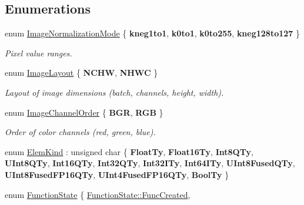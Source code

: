 \subsection*{Enumerations}
\begin{DoxyCompactItemize}
\item 
\mbox{\label{namespaceglow_af836699afb1d36a88df0d50d74fde931}} 
enum \hyperlink{namespaceglow_af836699afb1d36a88df0d50d74fde931}{Image\+Normalization\+Mode} \{ {\bfseries kneg1to1}, 
{\bfseries k0to1}, 
{\bfseries k0to255}, 
{\bfseries kneg128to127}
 \}\begin{DoxyCompactList}\small\item\em Pixel value ranges. \end{DoxyCompactList}
\item 
\mbox{\label{namespaceglow_a06c384b9844d09e4dd277eb509728dce}} 
enum \hyperlink{namespaceglow_a06c384b9844d09e4dd277eb509728dce}{Image\+Layout} \{ {\bfseries N\+C\+HW}, 
{\bfseries N\+H\+WC}
 \}\begin{DoxyCompactList}\small\item\em Layout of image dimensions (batch, channels, height, width). \end{DoxyCompactList}
\item 
\mbox{\label{namespaceglow_a2747942676633510584a944637b8eb59}} 
enum \hyperlink{namespaceglow_a2747942676633510584a944637b8eb59}{Image\+Channel\+Order} \{ {\bfseries B\+GR}, 
{\bfseries R\+GB}
 \}\begin{DoxyCompactList}\small\item\em Order of color channels (red, green, blue). \end{DoxyCompactList}
\item 
enum \hyperlink{namespaceglow_ab92e14a94329daf4083db670e95fbcdf}{Elem\+Kind} \+: unsigned char \{ \newline
{\bfseries Float\+Ty}, 
{\bfseries Float16\+Ty}, 
{\bfseries Int8\+Q\+Ty}, 
{\bfseries U\+Int8\+Q\+Ty}, 
\newline
{\bfseries Int16\+Q\+Ty}, 
{\bfseries Int32\+Q\+Ty}, 
{\bfseries Int32\+I\+Ty}, 
{\bfseries Int64\+I\+Ty}, 
\newline
{\bfseries U\+Int8\+Fused\+Q\+Ty}, 
{\bfseries U\+Int8\+Fused\+F\+P16\+Q\+Ty}, 
{\bfseries U\+Int4\+Fused\+F\+P16\+Q\+Ty}, 
{\bfseries Bool\+Ty}
 \}
\item 
enum \hyperlink{namespaceglow_a1c98da7214165b41c7d6b255503d4062}{Function\+State} \{ \hyperlink{namespaceglow_a1c98da7214165b41c7d6b255503d4062a3c96962620eddda2836d6203cf7ecfa0}{Function\+State\+::\+Func\+Created}, 

\end{DoxyCompactItemize}
